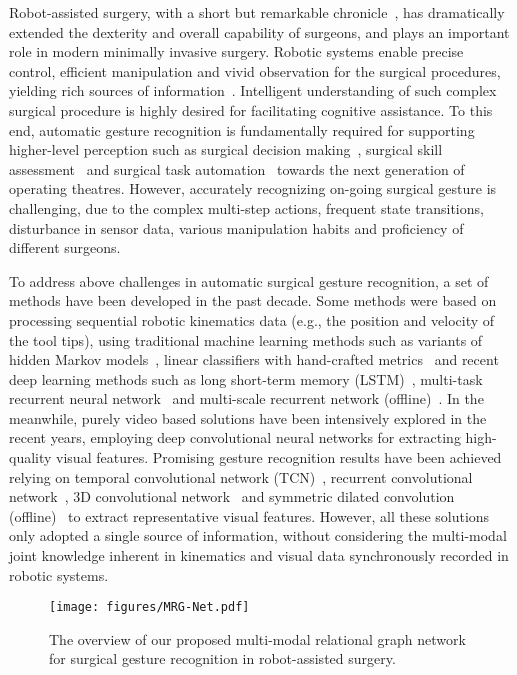 \documentclass[letterpaper, 10 pt, conference]{ieeeconf}
\begin{document}
Robot-assisted surgery, with a short but remarkable chronicle~\cite{moustris2011evolution}, has dramatically extended the dexterity and overall capability of surgeons, and plays an important role in modern minimally invasive surgery.
Robotic systems enable precise control, efficient manipulation and vivid observation for the surgical procedures, yielding rich sources of information~\cite{guthart2000intuitive}.
Intelligent understanding of such complex surgical procedure is highly desired for facilitating cognitive assistance. To this end, automatic gesture recognition is fundamentally required for supporting higher-level perception such as surgical decision making~\cite{maier2017surgical}, surgical skill assessment~\cite{poursartip2018analysis} and surgical task automation~\cite{nagy2019dvrk} towards the next generation of operating theatres.
However, accurately recognizing on-going surgical gesture is challenging, due to the complex multi-step actions, frequent state transitions, disturbance in sensor data, various manipulation habits and proficiency of different surgeons.

To address above challenges in automatic surgical gesture recognition, a set of methods have been developed in the past decade. Some methods were based on processing sequential robotic kinematics data (e.g., the position and velocity of the tool tips), using traditional machine learning methods such as variants of hidden Markov models~\cite{tao2012sparse,varadarajan2009data}, linear classifiers with hand-crafted metrics~\cite{zappella2013surgical} and recent deep learning methods such as long short-term memory (LSTM)~\cite{dipietro2016recognizing}, multi-task recurrent neural network~\cite{van2020multi} and multi-scale recurrent network (offline)~\cite{gurcan2019surgical}.
In the meanwhile, purely video based solutions have been intensively explored in the recent years, employing deep convolutional neural networks for extracting high-quality visual features.
Promising gesture recognition results have been achieved relying on temporal convolutional network (TCN)~\cite{lea2017temporal}, recurrent convolutional network~\cite{jin2017sv}, 3D convolutional network~\cite{funke2019using} and symmetric dilated convolution (offline)~\cite{zhang2020symmetric} to extract representative visual features.
However, all these solutions only adopted a single source of information,
without considering the multi-modal joint knowledge inherent in kinematics and visual data
synchronously recorded in robotic systems.

\begin{figure*}[t]
  \centering
  \texttt{[image: figures/MRG-Net.pdf]}
  \vspace{-5mm}
  \caption{The overview of our proposed multi-modal relational graph network for surgical gesture recognition in robot-assisted surgery.}
  \label{fig1}
  \vspace{-6mm}
\end{figure*}
\end{document}
